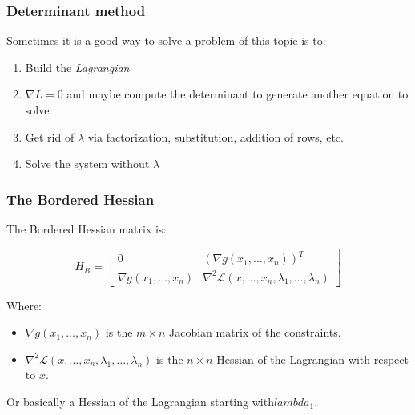 \subsubsection{Determinant method}

Sometimes it is a good way to solve a problem of this topic is to:

\begin{enumerate}
    
    \item Build the \emph{Lagrangian}
    
    \item \(\nabla L = 0\) and maybe compute the determinant to generate another equation to solve
    
    
    \item Get rid of \(\lambda\) via factorization, substitution, addition of rows, etc.
    
    \item Solve the system without \(\lambda\)

\end{enumerate}

\subsubsection{The Bordered Hessian}

The Bordered Hessian matrix is:

\[
    H_B =
    \begin{bmatrix}
    0 & {\left( \nabla g(x_1, \dots, x_n) \right)}^T \\
    \nabla g(x_1, \dots, x_n) & \nabla^2 \mathcal{L}(x, \dots, x_n, \lambda_1, \dots, \lambda_n)
    \end{bmatrix}
\]

Where:

\begin{itemize}

    \item \( \nabla  g(x_1, \dots, x_n) \) is the \( m \times n \) Jacobian matrix of the constraints.

    \item \( \nabla^2 \mathcal{L}(x, \dots, x_n, \lambda_1, \dots, \lambda_n) \) is the \( n \times n \) 
          Hessian of the Lagrangian with respect to \( x \).

\end{itemize}

Or basically a Hessian of the Lagrangian starting with\(lambda_1\).
\vspace{\baselineskip}

